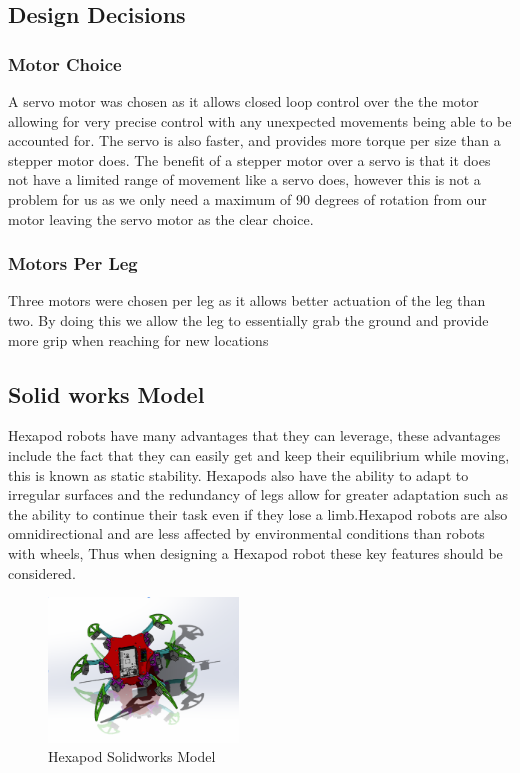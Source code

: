  




\subsection{Design Decisions}
\subsubsection{Motor Choice}
A servo motor was chosen as it allows closed loop control over the the motor allowing for very precise control with any unexpected movements being able to be accounted for. The servo is also faster, and provides more torque per size than a stepper motor does. The benefit of a stepper motor over a servo is that it does not have a limited range of movement like a servo does, however this is not a problem for us as we only need a maximum of 90 degrees of rotation from our motor leaving the servo motor as the clear choice.

\subsubsection{Motors Per Leg}
Three motors were chosen per leg as it allows better actuation of the leg than two. By doing this we allow the leg to essentially grab the ground and provide more grip when reaching for new locations

\subsection{Solid works Model}

Hexapod robots have many advantages that they can leverage, these advantages include the fact that they can easily get and keep their equilibrium while moving, this is known as static stability. Hexapods also have the ability to adapt to irregular surfaces and the redundancy of legs allow for greater adaptation such as the ability to continue their task even if they lose a limb.Hexapod robots are also omnidirectional and are less affected by environmental conditions than robots with wheels, \cite{pullteap2013development} Thus when designing a Hexapod robot these key features should be considered. 


\begin{figure}[h]
 \centering
   \includegraphics[width = 0.45\textwidth]{figures/3.png}                \caption{Hexapod Solidworks Model}
   \label{fig:Physical Model }
\end{figure}

